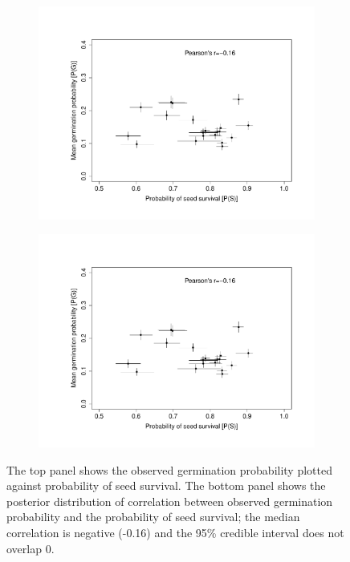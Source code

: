 \documentclass[12pt, oneside, titlepage]{article}   	%
\begin{document}
 
 \begin{figure}
\centering
\begin{subfigure}[h]{.65\textwidth}
\centering
       \includegraphics[page=1,width=1\textwidth]{../figures/germ_surv_correlation.pdf}  
\end{subfigure}

\begin{subfigure}[h]{.9\textwidth}
\centering
       \includegraphics[page=2,width=1\textwidth]{../figures/germ_surv_correlation.pdf}  
\end{subfigure}

 \caption{ The top panel shows the observed germination probability plotted against probability of seed survival. The bottom panel shows the posterior distribution of correlation between observed germination probability and the probability of seed survival; the median correlation is negative (-0.16) and the 95\% credible interval does not overlap 0. }
 
 \end{figure}

\clearpage

\end{document}
